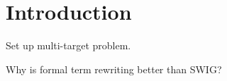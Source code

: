 
\section{Introduction}

Set up multi-target problem.

Why is formal term rewriting better than SWIG?
